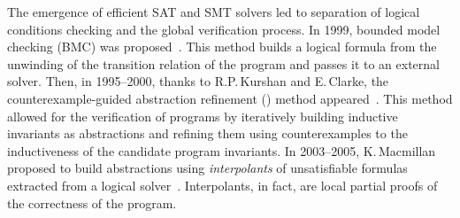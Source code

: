 The emergence of efficient SAT and SMT solvers led to separation of logical conditions checking and the global verification process. In 1999, bounded model checking (BMC) was proposed~\cite{10.1007/3-540-49059-0_14}. This method builds a logical formula from the unwinding of the transition relation of the program and passes it to an external solver. Then, in \numrange{1995}{2000}, thanks to R.P.\,Kurshan and E.\,Clarke, the counterexample-guided abstraction refinement (\cegar{}) method appeared~\cite{Kurshan1995,cegar}. This method allowed for the verification of programs by iteratively building inductive invariants as abstractions and refining them using counterexamples to the inductiveness of the candidate program invariants.
In \numrange{2003}{2005}, K.\,Macmillan proposed to build abstractions using \emph{interpolants} of unsatisfiable formulas extracted from a logical solver~\cite{10.1007/978-3-540-45069-6_1,10.1007/978-3-540-31980-1_1}.
Interpolants, in fact, are local partial proofs of the correctness of the program.


